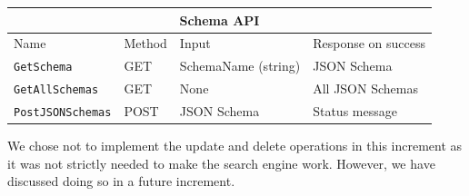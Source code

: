 \begin{table}[]
\begin{tabular}{|llll|}
\hline
\multicolumn{4}{|c|}{\textbf{Schema API}}                                                                                                     \\ \hline
\multicolumn{1}{|l|}{Name}                     & \multicolumn{1}{l|}{Method} & \multicolumn{1}{l|}{Input}               & Response on success \\ \hline
\multicolumn{1}{|l|}{\texttt{GetSchema}}       & \multicolumn{1}{l|}{GET}    & \multicolumn{1}{l|}{SchemaName (string)} & JSON Schema         \\ \hline
\multicolumn{1}{|l|}{\texttt{GetAllSchemas}}   & \multicolumn{1}{l|}{GET}    & \multicolumn{1}{l|}{None}                & All JSON Schemas    \\ \hline
\multicolumn{1}{|l|}{\texttt{PostJSONSchemas}} & \multicolumn{1}{l|}{POST}   & \multicolumn{1}{l|}{JSON Schema}         & Status message      \\ \hline
\end{tabular}
\end{table}


We chose not to implement the update and delete operations in this increment as it was not strictly needed to make the search engine work.
However, we have discussed doing so in a future increment.